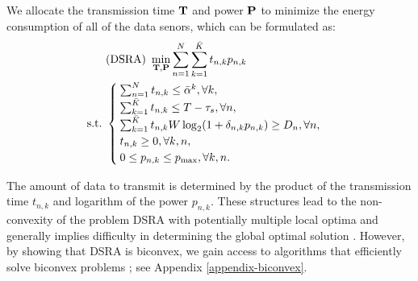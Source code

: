 \documentclass[journal]{IEEEtran} \ifCLASSINFOpdf
\begin{document}
We allocate the transmission time $\bf{T}$ and power $\bf{P}$ to minimize the energy consumption of all of the data senors, which can be formulated as:
\begin{align*}
&(\mbox{DSRA})~ \min_{ \bf{T, P}} \sum_{n=1}^N \sum_{k=1}^{\bar{K}} t_{n,k} p_{n,k} \\ \nonumber
{\rm s.t.}~ &\begin{cases}
  \sum_{n=1}^N t_{n,k} \leq \bar{\alpha}^k, \forall k,\\
  \sum_{k=1}^{\bar{K}} t_{n, k} \leq T-\tau_s, \forall n,\\
  \sum_{k=1}^{\bar{K}} t_{n, k} W \log_2(1 + \delta_{n,k} p_{n,k}) \geq D_n, \forall n, \\
  t_{n,k} \geq 0, \forall k, n, \\
  0 \leq p_{n,k} \leq p_{\max}, \forall k, n.
\end{cases}
\end{align*}

The amount of data to transmit is determined by the product of the transmission time $t_{n,k}$ and logarithm of the power $p_{n,k}$. These structures lead to the non-convexity of the problem DSRA with potentially multiple local optima and generally implies difficulty in determining the global optimal solution \cite{Floudas1990}. However, by showing that DSRA is biconvex, we gain access to algorithms that efficiently solve biconvex problems \cite{Gorski2007}; see Appendix \ref{appendix-biconvex}.
\end{document}
